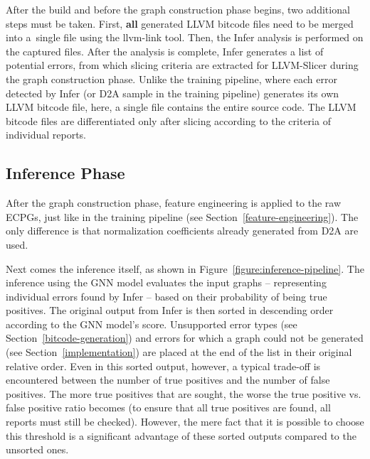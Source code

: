 After the build and before the graph construction phase begins, two additional steps must be taken. First, \textbf{all} generated LLVM bitcode files need to be merged into a~single file using the llvm-link tool. Then, the Infer analysis is performed on the captured files. After the analysis is complete, Infer generates a list of potential errors, from which slicing criteria are extracted for LLVM-Slicer during the graph construction phase. Unlike the training pipeline, where each error detected by Infer (or D2A sample in the training pipeline) generates its own LLVM bitcode file, here, a single file contains the entire source code. The LLVM bitcode files are differentiated only after slicing according to the criteria of individual reports.


\subsection{Inference Phase}
\label{inference-phase}
After the graph construction phase, feature engineering is applied to the raw ECPGs, just like in the training pipeline (see Section~\ref{feature-engineering}). The only difference is that normalization coefficients already generated from D2A are used.

Next comes the inference itself, as shown in Figure~\ref{figure:inference-pipeline}. The inference using the GNN model evaluates the input graphs -- representing individual errors found by Infer -- based on their probability of being true positives. The original output from Infer is then sorted in descending order according to the GNN model's score. Unsupported error types (see Section~\ref{bitcode-generation}) and errors for which a graph could not be generated (see Section~\ref{implementation}) are placed at the end of the list in their original relative order. Even in this sorted output, however, a typical trade-off is encountered between the number of true positives and the number of false positives. The more true positives that are sought, the worse the true positive vs. false positive ratio becomes (to ensure that all true positives are found, all reports must still be checked). However, the mere fact that it is possible to choose this threshold is a significant advantage of these sorted outputs compared to the unsorted ones.


